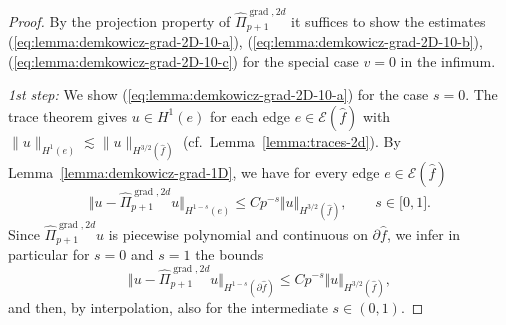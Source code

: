 \documentclass{article}
\newcommand\clr[1]{{\color{black} #1}}
\newcommand\neu[1]{{\color{red}#1}}
\newcommand{\hatPigradcomtwod}{\widehat\Pi^{\operatorname*{grad},2d}_{p+1}}
\begin{document}
\begin{proof} 
%
By the projection property of $\hatPigradcomtwod$
it suffices to show the estimates 
(\ref{eq:lemma:demkowicz-grad-2D-10-a}), 
(\ref{eq:lemma:demkowicz-grad-2D-10-b}), (\ref{eq:lemma:demkowicz-grad-2D-10-c})
for the special case $v = 0$ in the infimum. 

\emph{1st step:}
We show (\ref{eq:lemma:demkowicz-grad-2D-10-a}) for the case $s = 0$. 
%
The trace theorem gives $u \in H^1(e)$ for each edge $e \in {\mathcal E}(\widehat f)$ 
with $\|u\|_{H^1(e)} \lesssim \|u\|_{H^{3/2}(\widehat f)}$ 
(cf.\ Lemma~\ref{lemma:traces-2d}).
By Lemma~\ref{lemma:demkowicz-grad-1D}, 
we have for every edge $e\in{\mathcal{E}%
}(\widehat{f})$
\begin{equation}
\Vert u-\hatPigradcomtwod u\Vert_{H^{1-s}(e)}\leq Cp^{-s}%
\Vert u\Vert_{H^{3/2}(\widehat{f})},\qquad s\in\lbrack0,1].
\end{equation}
Since $\hatPigradcomtwod u$ is piecewise polynomial and continuous
on $\partial\widehat{f}$, we infer in particular for $s  = 0$ and $s=1$ the bounds
\begin{equation}
\Vert u-\hatPigradcomtwod u\Vert_{H^{1-s}(\partial\widehat{f})}\leq
Cp^{-s}\Vert u\Vert_{H^{3/2}(\widehat{f})},
\label{eq:lemma:demkowicz-grad-2D-15}%
\end{equation}
and then, by interpolation, also for the intermediate
$s\in(0,1)$. 


\end{proof}
\end{document}
